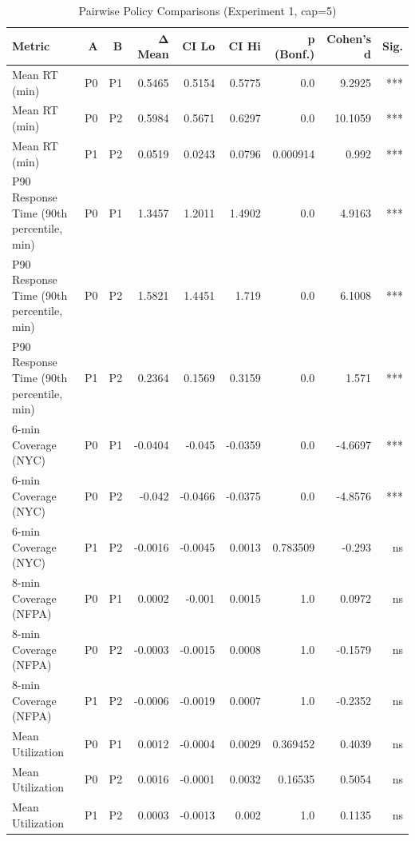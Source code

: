 \begin{table}[htbp]
\centering
\caption{Pairwise Policy Comparisons (Experiment 1, cap=5)}
\label{tab:pairwise}
\begin{tabular}{lrrrrrrrr}
\toprule
Metric & A & B & Δ Mean & CI Lo & CI Hi & p (Bonf.) & Cohen's d & Sig. \\
\midrule
Mean RT (min) & P0 & P1 & 0.5465 & 0.5154 & 0.5775 & 0.0 & 9.2925 & *** \\
Mean RT (min) & P0 & P2 & 0.5984 & 0.5671 & 0.6297 & 0.0 & 10.1059 & *** \\
Mean RT (min) & P1 & P2 & 0.0519 & 0.0243 & 0.0796 & 0.000914 & 0.992 & *** \\
P90 Response Time (90th percentile, min) & P0 & P1 & 1.3457 & 1.2011 & 1.4902 & 0.0 & 4.9163 & *** \\
P90 Response Time (90th percentile, min) & P0 & P2 & 1.5821 & 1.4451 & 1.719 & 0.0 & 6.1008 & *** \\
P90 Response Time (90th percentile, min) & P1 & P2 & 0.2364 & 0.1569 & 0.3159 & 0.0 & 1.571 & *** \\
6-min Coverage (NYC) & P0 & P1 & -0.0404 & -0.045 & -0.0359 & 0.0 & -4.6697 & *** \\
6-min Coverage (NYC) & P0 & P2 & -0.042 & -0.0466 & -0.0375 & 0.0 & -4.8576 & *** \\
6-min Coverage (NYC) & P1 & P2 & -0.0016 & -0.0045 & 0.0013 & 0.783509 & -0.293 & ns \\
8-min Coverage (NFPA) & P0 & P1 & 0.0002 & -0.001 & 0.0015 & 1.0 & 0.0972 & ns \\
8-min Coverage (NFPA) & P0 & P2 & -0.0003 & -0.0015 & 0.0008 & 1.0 & -0.1579 & ns \\
8-min Coverage (NFPA) & P1 & P2 & -0.0006 & -0.0019 & 0.0007 & 1.0 & -0.2352 & ns \\
Mean Utilization & P0 & P1 & 0.0012 & -0.0004 & 0.0029 & 0.369452 & 0.4039 & ns \\
Mean Utilization & P0 & P2 & 0.0016 & -0.0001 & 0.0032 & 0.16535 & 0.5054 & ns \\
Mean Utilization & P1 & P2 & 0.0003 & -0.0013 & 0.002 & 1.0 & 0.1135 & ns \\
\bottomrule
\end{tabular}
\end{table}